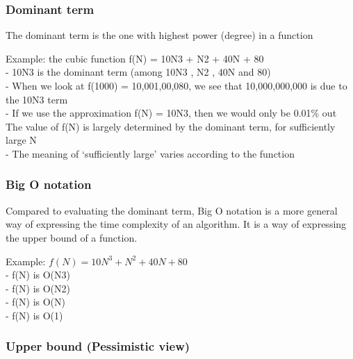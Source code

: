 \documentclass{article}
\begin{document}
\subsubsection{Dominant term}

The dominant term is the one with highest power (degree) in a function

Example: the cubic function f(N) = 10N3 + N2 + 40N + 80 \\

    - 10N3 is the dominant term (among 10N3 , N2 , 40N and 80) \\
    - When we look at f(1000) = 10,001,00,080, we see that 10,000,000,000 is due to the 10N3 term \\
    - If we use the approximation f(N) = 10N3, then we would only be 0.01\% out \\

The value of f(N) is largely determined by the dominant term, for sufficiently large N \\
    - The meaning of ‘sufficiently large’ varies according to the function \\


\subsubsection{Big O notation}

Compared to evaluating the dominant term, Big O notation is a more general way of expressing the time complexity of an algorithm. It is a way of expressing the upper bound of a function.

Example: $f(N) = 10N^3 + N^2 + 40N + 80$ \\
    - f(N) is O(N3) \\
    - f(N) is O(N2) \\
    - f(N) is O(N) \\
    - f(N) is O(1) \\

\subsubsection{Upper bound (Pessimistic view)}
\end{document}
